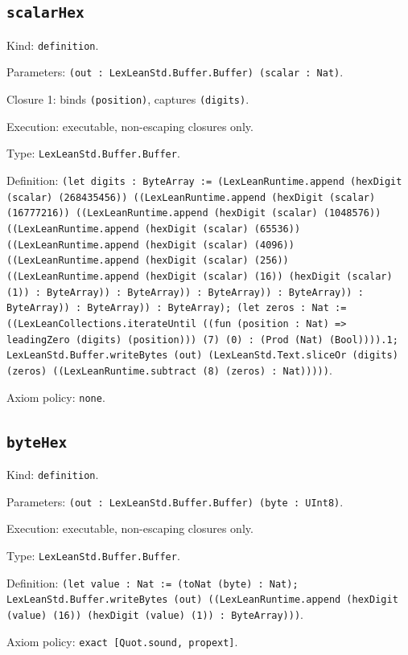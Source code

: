 \documentclass[11pt]{article}
\begin{document}
\subsection*{\texttt{scalarHex}}
\noindent Kind: \texttt{definition}.\par
\noindent Parameters: \texttt{(out : LexLeanStd.Buffer.Buffer) (scalar : Nat)}.\par
\noindent Closure 1: binds \texttt{(position)}, captures \texttt{(digits)}.\par
\noindent Execution: executable, non-escaping closures only.\par
\noindent Type: \texttt{LexLeanStd.Buffer.Buffer}.\par
\noindent Definition: \texttt{(let digits : ByteArray := (LexLeanRuntime.append (hexDigit (scalar) (268435456)) ((LexLeanRuntime.append (hexDigit (scalar) (16777216)) ((LexLeanRuntime.append (hexDigit (scalar) (1048576)) ((LexLeanRuntime.append (hexDigit (scalar) (65536)) ((LexLeanRuntime.append (hexDigit (scalar) (4096)) ((LexLeanRuntime.append (hexDigit (scalar) (256)) ((LexLeanRuntime.append (hexDigit (scalar) (16)) (hexDigit (scalar) (1)) : ByteArray)) : ByteArray)) : ByteArray)) : ByteArray)) : ByteArray)) : ByteArray)) : ByteArray); (let zeros : Nat := ((LexLeanCollections.iterateUntil ((fun (position : Nat) => leadingZero (digits) (position))) (7) (0) : (Prod (Nat) (Bool)))).1; LexLeanStd.Buffer.writeBytes (out) (LexLeanStd.Text.sliceOr (digits) (zeros) ((LexLeanRuntime.subtract (8) (zeros) : Nat)))))}.\par
\noindent Axiom policy: \texttt{none}.\par
\subsection*{\texttt{byteHex}}
\noindent Kind: \texttt{definition}.\par
\noindent Parameters: \texttt{(out : LexLeanStd.Buffer.Buffer) (byte : UInt8)}.\par
\noindent Execution: executable, non-escaping closures only.\par
\noindent Type: \texttt{LexLeanStd.Buffer.Buffer}.\par
\noindent Definition: \texttt{(let value : Nat := (toNat (byte) : Nat); LexLeanStd.Buffer.writeBytes (out) ((LexLeanRuntime.append (hexDigit (value) (16)) (hexDigit (value) (1)) : ByteArray)))}.\par
\noindent Axiom policy: \texttt{exact [Quot.sound, propext]}.\par
\end{document}
